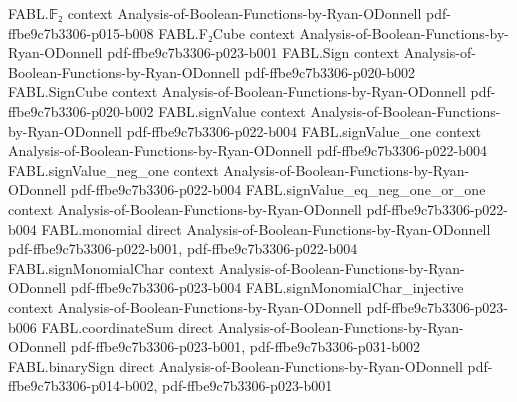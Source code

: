 \begin{theorem}
\label{FABL.exists_parity_close_of_signBlr_acceptanceProbability_ge}
\leanok
{}
\proofstep
  {FABL.𝔽₂}
  {context}
  {Analysis-of-Boolean-Functions-by-Ryan-ODonnell}
  {pdf-ffbe9c7b3306-p015-b008}
\proofstep
  {FABL.F₂Cube}
  {context}
  {Analysis-of-Boolean-Functions-by-Ryan-ODonnell}
  {pdf-ffbe9c7b3306-p023-b001}
\proofstep
  {FABL.Sign}
  {context}
  {Analysis-of-Boolean-Functions-by-Ryan-ODonnell}
  {pdf-ffbe9c7b3306-p020-b002}
\proofstep
  {FABL.SignCube}
  {context}
  {Analysis-of-Boolean-Functions-by-Ryan-ODonnell}
  {pdf-ffbe9c7b3306-p020-b002}
\proofstep
  {FABL.signValue}
  {context}
  {Analysis-of-Boolean-Functions-by-Ryan-ODonnell}
  {pdf-ffbe9c7b3306-p022-b004}
\proofstep
  {FABL.signValue_one}
  {context}
  {Analysis-of-Boolean-Functions-by-Ryan-ODonnell}
  {pdf-ffbe9c7b3306-p022-b004}
\proofstep
  {FABL.signValue_neg_one}
  {context}
  {Analysis-of-Boolean-Functions-by-Ryan-ODonnell}
  {pdf-ffbe9c7b3306-p022-b004}
\proofstep
  {FABL.signValue_eq_neg_one_or_one}
  {context}
  {Analysis-of-Boolean-Functions-by-Ryan-ODonnell}
  {pdf-ffbe9c7b3306-p022-b004}
\proofstep
  {FABL.monomial}
  {direct}
  {Analysis-of-Boolean-Functions-by-Ryan-ODonnell}
  {pdf-ffbe9c7b3306-p022-b001,
    pdf-ffbe9c7b3306-p022-b004}
\proofstep
  {FABL.signMonomialChar}
  {context}
  {Analysis-of-Boolean-Functions-by-Ryan-ODonnell}
  {pdf-ffbe9c7b3306-p023-b004}
\proofstep
  {FABL.signMonomialChar_injective}
  {context}
  {Analysis-of-Boolean-Functions-by-Ryan-ODonnell}
  {pdf-ffbe9c7b3306-p023-b006}
\proofstep
  {FABL.coordinateSum}
  {direct}
  {Analysis-of-Boolean-Functions-by-Ryan-ODonnell}
  {pdf-ffbe9c7b3306-p023-b001,
    pdf-ffbe9c7b3306-p031-b002}
\proofstep
  {FABL.binarySign}
  {direct}
  {Analysis-of-Boolean-Functions-by-Ryan-ODonnell}
  {pdf-ffbe9c7b3306-p014-b002,
    pdf-ffbe9c7b3306-p023-b001}

\end{theorem}
